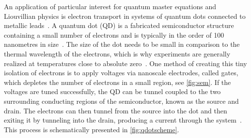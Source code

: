 \documentclass[../main.tex]{subfiles}
\begin{document}
An application of particular interest for quantum master equations and Liouvillian physics is electron transport in systems of quantum dots connected to metallic leads~\cite{qdottrans}. A quantum dot (QD) is a fabricated semiconductor structure containing a small number of electrons and is typically in the order of 100 nanometres in size~\cite{qdotmarcus}. The size of the dot needs to be small in comparison to the thermal wavelength of the electrons, which is why experiments are generally realized at temperatures close to absolute zero~\cite{transport}. One method of creating this tiny isolation of electrons is to apply voltages via nanoscale electrodes, called gates, which depletes the number of electrons in a small region, see \cref{fig:sem}. If the voltages are tuned successfully, the QD can be tunnel coupled to the two surrounding conducting regions of the semiconductor, known as the source and drain. The electrons can then tunnel from the source into the dot and then exiting it by tunneling into the drain, producing a current through the system~\cite{qdotmarcus}. This process is schematically presented in \cref{fig:qdotscheme}.
\end{document}
